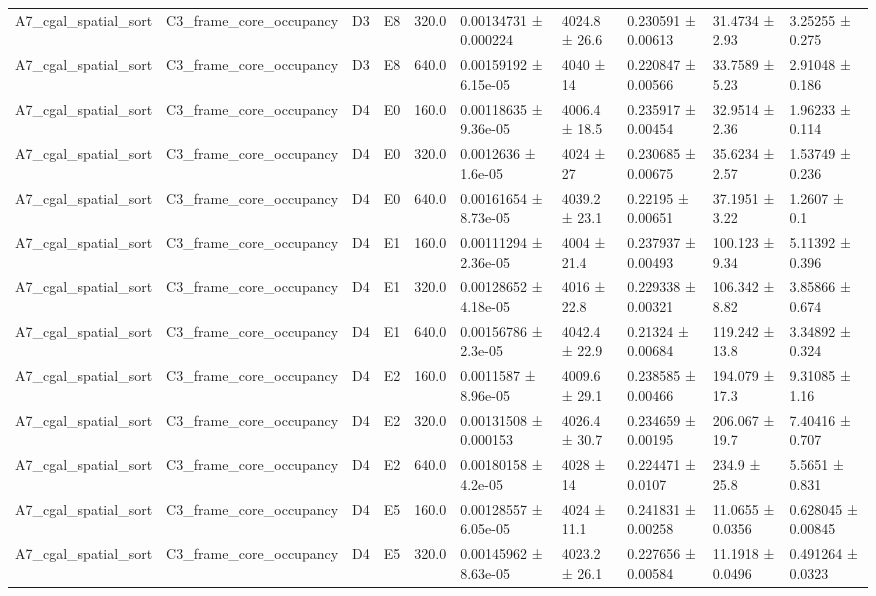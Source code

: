 \begin{table}
\begin{tabular}{llllllllll}
A7\_cgal\_spatial\_sort & C3\_frame\_core\_occupancy & D3 & E8 & 320.0 & 0.00134731 ± 0.000224 & 4024.8 ± 26.6 & 0.230591 ± 0.00613 & 31.4734 ± 2.93 & 3.25255 ± 0.275 \\
A7\_cgal\_spatial\_sort & C3\_frame\_core\_occupancy & D3 & E8 & 640.0 & 0.00159192 ± 6.15e-05 & 4040 ± 14 & 0.220847 ± 0.00566 & 33.7589 ± 5.23 & 2.91048 ± 0.186 \\
A7\_cgal\_spatial\_sort & C3\_frame\_core\_occupancy & D4 & E0 & 160.0 & 0.00118635 ± 9.36e-05 & 4006.4 ± 18.5 & 0.235917 ± 0.00454 & 32.9514 ± 2.36 & 1.96233 ± 0.114 \\
A7\_cgal\_spatial\_sort & C3\_frame\_core\_occupancy & D4 & E0 & 320.0 & 0.0012636 ± 1.6e-05 & 4024 ± 27 & 0.230685 ± 0.00675 & 35.6234 ± 2.57 & 1.53749 ± 0.236 \\
A7\_cgal\_spatial\_sort & C3\_frame\_core\_occupancy & D4 & E0 & 640.0 & 0.00161654 ± 8.73e-05 & 4039.2 ± 23.1 & 0.22195 ± 0.00651 & 37.1951 ± 3.22 & 1.2607 ± 0.1 \\
A7\_cgal\_spatial\_sort & C3\_frame\_core\_occupancy & D4 & E1 & 160.0 & 0.00111294 ± 2.36e-05 & 4004 ± 21.4 & 0.237937 ± 0.00493 & 100.123 ± 9.34 & 5.11392 ± 0.396 \\
A7\_cgal\_spatial\_sort & C3\_frame\_core\_occupancy & D4 & E1 & 320.0 & 0.00128652 ± 4.18e-05 & 4016 ± 22.8 & 0.229338 ± 0.00321 & 106.342 ± 8.82 & 3.85866 ± 0.674 \\
A7\_cgal\_spatial\_sort & C3\_frame\_core\_occupancy & D4 & E1 & 640.0 & 0.00156786 ± 2.3e-05 & 4042.4 ± 22.9 & 0.21324 ± 0.00684 & 119.242 ± 13.8 & 3.34892 ± 0.324 \\
A7\_cgal\_spatial\_sort & C3\_frame\_core\_occupancy & D4 & E2 & 160.0 & 0.0011587 ± 8.96e-05 & 4009.6 ± 29.1 & 0.238585 ± 0.00466 & 194.079 ± 17.3 & 9.31085 ± 1.16 \\
A7\_cgal\_spatial\_sort & C3\_frame\_core\_occupancy & D4 & E2 & 320.0 & 0.00131508 ± 0.000153 & 4026.4 ± 30.7 & 0.234659 ± 0.00195 & 206.067 ± 19.7 & 7.40416 ± 0.707 \\
A7\_cgal\_spatial\_sort & C3\_frame\_core\_occupancy & D4 & E2 & 640.0 & 0.00180158 ± 4.2e-05 & 4028 ± 14 & 0.224471 ± 0.0107 & 234.9 ± 25.8 & 5.5651 ± 0.831 \\
A7\_cgal\_spatial\_sort & C3\_frame\_core\_occupancy & D4 & E5 & 160.0 & 0.00128557 ± 6.05e-05 & 4024 ± 11.1 & 0.241831 ± 0.00258 & 11.0655 ± 0.0356 & 0.628045 ± 0.00845 \\
A7\_cgal\_spatial\_sort & C3\_frame\_core\_occupancy & D4 & E5 & 320.0 & 0.00145962 ± 8.63e-05 & 4023.2 ± 26.1 & 0.227656 ± 0.00584 & 11.1918 ± 0.0496 & 0.491264 ± 0.0323 \\

\end{tabular}
\end{table}
